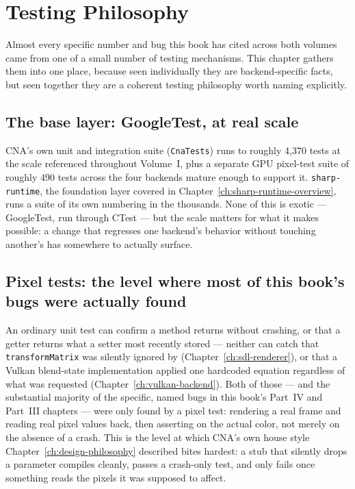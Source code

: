 \chapter{Testing Philosophy}
\label{ch:testing-philosophy}

Almost every specific number and bug this book has cited across both volumes came from one
of a small number of testing mechanisms. This chapter gathers them into one place, because
seen individually they are backend-specific facts, but seen together they are a coherent
testing philosophy worth naming explicitly.

\section{The base layer: GoogleTest, at real scale}

CNA's own unit and integration suite (\texttt{CnaTests}) runs to roughly 4{,}370 tests at the
scale referenced throughout Volume~I, plus a separate GPU pixel-test suite of roughly 490
tests across the four backends mature enough to support it. \texttt{sharp-runtime}, the
foundation layer covered in Chapter~\ref{ch:sharp-runtime-overview}, runs a suite of its own
numbering in the thousands. None of this is exotic --- GoogleTest, run through CTest --- but
the scale matters for what it makes possible: a change that regresses one backend's behavior
without touching another's has somewhere to actually surface.

\section{Pixel tests: the level where most of this book's bugs were actually found}

An ordinary unit test can confirm a method returns without crashing, or that a getter returns
what a setter most recently stored --- neither can catch that
\texttt{transformMatrix} was silently ignored by 
(Chapter~\ref{ch:sdl-renderer}), or that a Vulkan blend-state implementation applied one
hardcoded equation regardless of what was requested (Chapter~\ref{ch:vulkan-backend}). Both
of those --- and the substantial majority of the specific, named bugs in this book's Part~IV
and Part~III chapters --- were only found by a pixel test: rendering a real frame and reading
real pixel values back, then asserting on the actual color, not merely on the absence of a
crash. This is the level at which CNA's own house style Chapter~\ref{ch:design-philosophy}
described bites hardest: a stub that silently drops a parameter compiles cleanly, passes a
crash-only test, and only fails once something reads the pixels it was supposed to affect.

